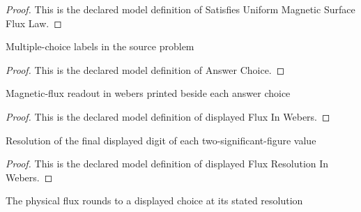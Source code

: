 \begin{proof}
  This is the declared model definition of Satisfies Uniform Magnetic Surface Flux Law.
\end{proof}
\begin{definition}
  \label{def:physics:phyx-mini-0925:phyxminiproblems-problemphyxmini0925-answerchoice}
  Multiple-choice labels in the source problem
\end{definition}
\begin{proof}
  This is the declared model definition of Answer Choice.
\end{proof}
\begin{definition}
  \label{def:physics:phyx-mini-0925:phyxminiproblems-problemphyxmini0925-displayedfluxinwebers}
  Magnetic-flux readout in webers printed beside each answer choice
\end{definition}
\begin{proof}
  This is the declared model definition of displayed Flux In Webers.
\end{proof}
\begin{definition}
  \label{def:physics:phyx-mini-0925:phyxminiproblems-problemphyxmini0925-displayedfluxresolutioninwebers}
  Resolution of the final displayed digit of each two-significant-figure value
\end{definition}
\begin{proof}
  This is the declared model definition of displayed Flux Resolution In Webers.
\end{proof}
\begin{definition}
  \label{def:physics:phyx-mini-0925:phyxminiproblems-problemphyxmini0925-roundstodisplayedflux}
  The physical flux rounds to a displayed choice at its stated resolution
\end{definition}
